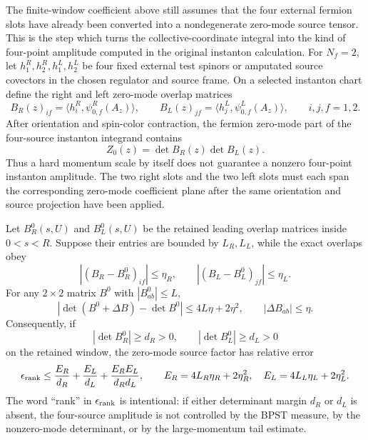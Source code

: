 \begin{controlledapproximation}
\label{ca:four-source-instanton-amplitude-rank-bound}
The finite-window coefficient above still assumes that the four external
fermion slots have already been converted into a nondegenerate zero-mode
source tensor.  This is the step which turns the collective-coordinate
integral into the kind of four-point amplitude computed in the original
instanton calculation.  For \(N_f=2\), let
\(h^R_1,h^R_2,h^L_1,h^L_2\) be four fixed external test spinors or amputated
source covectors in the chosen regulator and source frame.  On a selected
instanton chart define the right and left zero-mode overlap matrices
\[
  B_R(z)_{if}=\langle h_i^R,\psi_{0,f}^R(A_z)\rangle,\qquad
  B_L(z)_{jf}=\langle h_j^L,\psi_{0,f}^L(A_z)\rangle,
  \qquad i,j,f=1,2 .
\]
After orientation and spin-color contraction, the fermion zero-mode part of
the four-source instanton integrand contains
\[
  Z_0(z)=\det B_R(z)\det B_L(z).
\]
Thus a hard momentum scale by itself does not guarantee a nonzero four-point
instanton amplitude.  The two right slots and the two left slots must each
span the corresponding zero-mode coefficient plane after the same
orientation and source projection have been applied.

Let \(B_R^0(s,U)\) and \(B_L^0(s,U)\) be the retained leading overlap matrices
inside \(0<s<R\).  Suppose their entries are bounded by \(L_R,L_L\), while
the exact overlaps obey
\[
  |(B_R-B_R^0)_{if}|\le\eta_R,\qquad
  |(B_L-B_L^0)_{jf}|\le\eta_L .
\]
For any \(2\times2\) matrix \(B^0\) with \(|B^0_{ab}|\le L\),
\begin{equation}
  |\det(B^0+\Delta B)-\det B^0|
  \le
  4L\eta+2\eta^2,
  \qquad |\Delta B_{ab}|\le\eta .
  \label{eq:four-source-determinant-stability}
\end{equation}
Consequently, if
\[
  |\det B_R^0|\ge d_R>0,\qquad
  |\det B_L^0|\ge d_L>0
\]
on the retained window, the zero-mode source factor has relative error
\begin{equation}
  \epsilon_{\rm rank}
  \le
  \frac{E_R}{d_R}
  +
  \frac{E_L}{d_L}
  +
  \frac{E_RE_L}{d_Rd_L},
  \qquad
  E_R=4L_R\eta_R+2\eta_R^2,\quad
  E_L=4L_L\eta_L+2\eta_L^2 .
  \label{eq:four-source-rank-error}
\end{equation}
The word ``rank'' in \(\epsilon_{\rm rank}\) is intentional: if either
determinant margin \(d_R\) or \(d_L\) is absent, the four-source amplitude is
not controlled by the BPST measure, by the nonzero-mode determinant, or by the
large-momentum tail estimate.


\end{controlledapproximation}
